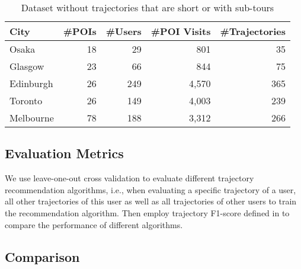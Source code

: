 \begin{table}
\centering
\caption{Dataset without trajectories that are short or with sub-tours}
\label{table:data:perfect}
\scriptsize
\begin{tabular}{lrrrr} \hline
\textbf{City} & \textbf{\#POIs} & \textbf{\#Users} & \textbf{\#POI Visits} & \textbf{\#Trajectories} \\ \hline
Osaka & 18 & 29 & 801 & 35 \\ 
Glasgow & 23 & 66 & 844 & 75 \\ 
Edinburgh & 26 & 249 & 4,570 & 365 \\ 
Toronto & 26 & 149 & 4,003 & 239 \\ 
Melbourne & 78 & 188 & 3,312 & 266 \\ 
\hline
\end{tabular}
\end{table}



\subsection{Evaluation Metrics}
\label{experiment:metric}
We use leave-one-out cross validation to evaluate different trajectory recommendation algorithms,
i.e., when evaluating a specific trajectory of a user, all other trajectories of this user as well as 
all trajectories of other users to train the recommendation algorithm.
Then employ trajectory F1-score defined in \cite{ijcai15} to compare the performance of different algorithms.


\subsection{Comparison}
\label{experiment:comparison}

